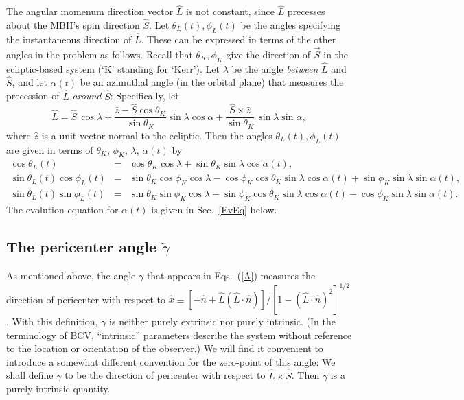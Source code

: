 \documentclass[11pt]{report}
\def\be{\begin{equation}}
\def\ee{\end{equation}}
\begin{document}
The angular momenum direction vector $\hat L$ is not constant, since $\hat L$ precesses about the MBH's spin
direction $\hat S$.  Let $\theta_L(t),\phi_L(t)$ be the angles specifying the instantaneous
direction of $\hat L$.  These can be expressed in terms of the other angles in the problem
as follows.
Recall that  $\theta_K,\phi_K$  give the direction of $\vec S$ in the ecliptic-based
system (`K' standing for `Kerr'). 
Let $\lambda$ be the angle {\it between} $\hat L$ and $\hat S$, and let
$\alpha(t)$ be an azimuthal angle (in the orbital plane) that measures the
precession of $\hat L$ {\it around} $\hat S$:
Specifically, let
\be \label{alpha}
\hat L = \hat S \, \cos\lambda +
\frac{\hat z - \hat S \cos\theta_K}{\sin\theta_K} \sin\lambda \cos\alpha
+ \frac{\hat S \times \hat z}{\sin\theta_K}  \, \sin\lambda \sin\alpha,
\ee
\noindent
where $\hat z$ is a unit vector normal to the ecliptic. Then the angles
$\theta_L(t),\phi_L(t)$ are given in terms of $\theta_K$, $\phi_K$,
$\lambda$, $\alpha(t)$ by
\begin{eqnarray}\label{relations3}
\cos\theta_L(t) &=& \cos\theta_K \cos\lambda
    +\sin\theta_K\sin\lambda\cos\alpha(t), \nonumber\\
\sin\theta_L(t)\cos\phi_L(t) &=&
\sin\theta_K\cos\phi_K\cos\lambda
-\cos\phi_K\cos\theta_K\sin\lambda\cos\alpha(t)
+\sin\phi_K\sin\lambda\sin\alpha(t),  \nonumber\\
\sin\theta_L(t)\sin\phi_L(t) &=&
\sin\theta_K\sin\phi_K\cos\lambda
-\sin\phi_K\cos\theta_K\sin\lambda\cos\alpha(t)
-\cos\phi_K\sin\lambda\sin\alpha(t) .
\end{eqnarray}
The evolution equation for $\alpha(t)$ is given in Sec.\  \ref{EvEq} below.


\subsection{The pericenter angle $\tilde \gamma$ }

As mentioned above, the angle $\gamma$ that appears in Eqs.\ (\ref{A})
measures the
direction of pericenter with respect to
$\hat x \equiv [-\hat n + \hat L (\hat L\cdot \hat n)]/
[1-(\hat L\cdot \hat n)^2]^{1/2}$. With this definition,
$\gamma$ is neither purely extrinsic nor purely intrinsic.
(In the terminology of BCV, ``intrinsic'' parameters describe the
system without reference to the location or orientation of the observer.)
We will find it convenient to introduce a
somewhat different convention for the
zero-point of this angle: We shall define $\tilde\gamma$ to be
the direction of pericenter
with respect to $\hat L \times \hat S$. Then $\tilde\gamma$
is a purely intrinsic quantity.
\end{document}
